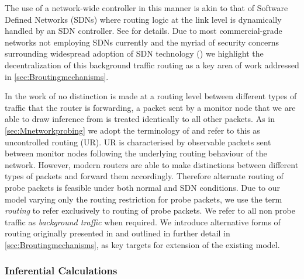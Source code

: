The use of a network-wide controller in this manner is akin to that of Software Defined Networks (SDNs) where routing logic at the link level is dynamically handled by an SDN controller. See \cite{kreutz_software-defined_2015} for details. Due to most commercial-grade networks not employing SDNs currently and the myriad of security concerns surrounding widespread adoption of SDN technology (\cite{wood_scalable_2021}) we highlight the decentralization of this background traffic routing as a key area of work addressed in \cref{sec:Broutingmechanisms}.\par
In the work of \cite{barnes_stochastic_2020} no distinction is made at a routing level between different types of traffic that the router is forwarding, a packet sent by a monitor node that we are able to draw inference from is treated identically to all other packets. As in \cref{sec:Mnetworkprobing} we adopt the terminology of \cite{he_network_2021} and refer to this as uncontrolled routing (UR). UR is characterised by observable packets sent between monitor nodes following the underlying routing behaviour of the network. However, modern routers are able to make distinctions between different types of packets and forward them accordingly. Therefore alternate routing of probe packets is feasible under both normal and SDN conditions. Due to our model varying only the routing restriction for probe packets, we use the term \textit{routing} to refer exclusively to routing of probe packets. We refer to all non probe traffic as \textit{background traffic} when required. We introduce alternative forms of routing originally presented in \cite{he_network_2021} and outlined in further detail in \cref{sec:Broutingmechanisms}, as key targets for extension of the existing model.

\subsubsection*{Inferential Calculations}
\label{sssec:Iinferentialcalculations}

